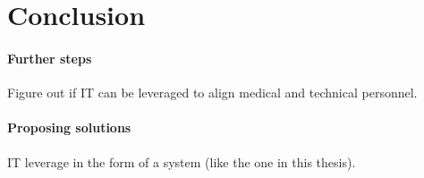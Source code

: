 \section{Conclusion}
\paragraph{Further steps}
Figure out if IT can be leveraged to align medical and technical personnel.
\paragraph{Proposing solutions}
IT leverage in the form of a system (like the one in this thesis).